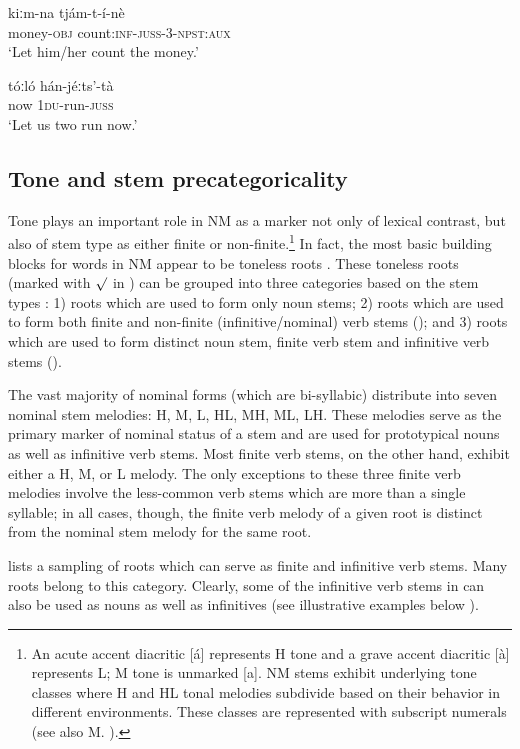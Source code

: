 \documentclass[output=paper]{langsci/langscibook}
\begin{document}
\ea\label{ex:mahland:14}
\gll kiːm-na        tjám-t-í-nè\\
money-\textsc{obj}   count:\textsc{inf-juss-3-npst:aux}\\
\glt `Let him/her count the money.'
\z

\ea\label{ex:mahland:15}
\gll tóːló    hán-jéːts'-tà  \\
now    \textsc{1du}{}-run\textsc{{}-juss}\\
\glt `Let us two run now.' 
\z

\subsection{Tone and stem precategoricality}\label{sec:mahland:1.3}

Tone plays an important role in NM as a marker not only of lexical contrast, but also of stem type as either finite or non-finite.\footnote{An acute accent diacritic [á] represents H tone and a grave accent diacritic [à] represents L; M tone is unmarked [a]. NM stems exhibit underlying tone classes where H and HL tonal melodies subdivide based on their behavior in different environments. These classes are represented with subscript numerals (see also M. \citealt[146]{AhlandM2012}).} In fact, the most basic building blocks for words in NM appear to be toneless roots \citep[182]{AhlandM2012}. These toneless roots (marked with ${\surd}$ in ) can be grouped into three categories based on the stem types \citep{Ahland2014a}: 1) roots which are used to form only noun stems; 2) roots which are used to form both finite and non-finite (infinitive/nominal) verb stems (); and 3) roots which are used to form distinct noun stem, finite verb stem and infinitive verb stems (). 

The vast majority of nominal forms (which are bi-syllabic) distribute into seven nominal stem melodies: H, M, L, HL, MH, ML, LH. These melodies serve as the primary marker of nominal status of a stem and are used for prototypical nouns as well as infinitive verb stems. Most finite verb stems, on the other hand, exhibit either a H, M, or L melody. The only exceptions to these three finite verb melodies involve the less-common verb stems which are more than a single syllable; in all cases, though, the finite verb melody of a given root is distinct from the nominal stem melody for the same root. 

 lists a sampling of roots which can serve as finite and infinitive verb  stems. Many roots belong to this category. Clearly, some of the infinitive verb stems in  can also be used as nouns as well as infinitives (see illustrative examples below ). 
\end{document}
